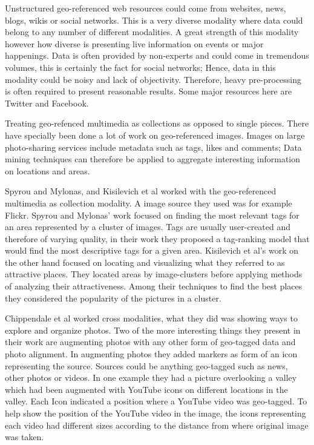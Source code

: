 \documentclass[journal]{IEEEtran}
\begin{document}
Unstructured geo-referenced web resources could come from websites, news, blogs, wikis or social networks. This is a very diverse modality where data could belong to any number of different modalities. A great strength of this modality however how diverse is presenting live information on events or major happenings. Data is often provided by non-experts and could come in tremendous volumes, this is certainly the fact for social networks; Hence, data in this modality could be noisy and lack of objectivity. Therefore, heavy pre-processing is often required to present reasonable results. Some major resources here are Twitter\cite{twitter} and Facebook\cite{facebook}. 

Treating geo-refenced multimedia as collections as opposed to single pieces. There have specially been done a lot of work on geo-referenced images. Images on large photo-sharing services include metadata such as tags, likes and comments; Data mining techniques can therefore be applied to aggregate interesting information on locations and areas.

Spyrou and Mylonas\cite{placing-meta-on-map}, and Kisilevich et al\cite{next-vacation} worked with the geo-referenced multimedia as collection modality. A image source they used was for example Flickr\cite{flickr}. Spyrou and Mylonas' work focused on finding the most relevant tags for an area represented by a cluster of images. Tags are usually user-created and therefore of varying quality, in their work they proposed a tag-ranking model that would find the most descriptive tags for a given area. Kisilevich et al's work on the other hand focused on locating and visualizing what they referred to as attractive places. They located areas by image-clusters before applying methods of analyzing their attractiveness. Among their techniques to find the best places they considered the popularity of the pictures in a cluster.

Chippendale et al\cite{collective-photography} worked cross modalities, what they did was showing ways to explore and organize photos. Two of the more interesting things they present in their work are augmenting photos with any other form of geo-tagged data and photo alignment. In augmenting photos they added markers as form of an icon representing the source. Sources could be anything geo-tagged such as news, other photos or videos. In one example they had a picture overlooking a valley which had been augmented with YouTube icons on different locations in the valley. Each Icon indicated a position where a YouTube video was geo-tagged. To help show the position of the YouTube video in the image, the icons representing each video had different sizes according to the distance from where original image was taken.
\end{document}
